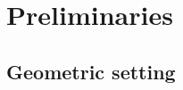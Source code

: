 \documentclass[11pt, a4paper]{article}
\begin{document}










\section{Preliminaries}\label{sec:preliminaries}


\subsection{Geometric setting }
\end{document}
